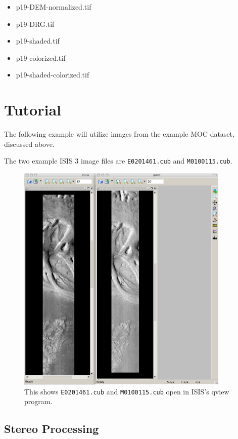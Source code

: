\begin{itemize}
\item p19-DEM-normalized.tif
\item p19-DRG.tif 
\item p19-shaded.tif
\item p19-colorized.tif
\item p19-shaded-colorized.tif
\end{itemize}


\section{Tutorial}

The following example will utilize images from the example MOC dataset, discussed above.

The two example ISIS 3 image files are \texttt{E0201461.cub} and
\texttt{M0100115.cub}.

\begin{figure}
\begin{center}
\includegraphics[width=4in]{images/p19-images.png}
\caption[P19 images open in qview]{
    \label{p19-images}
    This shows \texttt{E0201461.cub} and \texttt{M0100115.cub} open in
	ISIS's qview program.
    }
\end{center}
\end{figure}

\subsection{Stereo Processing}

